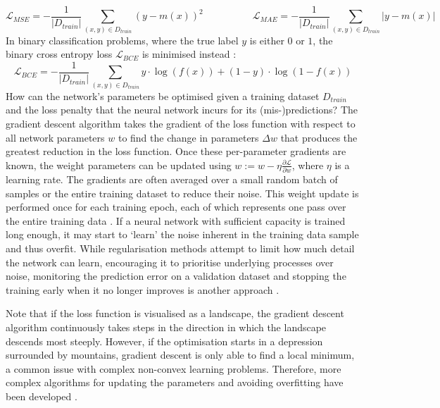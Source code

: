 \begin{equation*}
    \mathcal{L}_{MSE} = -\frac{1}{|D_{train}|} \sum_{(x, y) \in D_{train}}{(y - m(x))^2} \quad \quad \quad \quad \quad \mathcal{L}_{MAE} = -\frac{1}{|D_{train}|} \sum_{(x, y) \in D_{train}}{|y - m(x)|}
\end{equation*}
In binary classification problems, where the true label $y$ is either $0$ or $1$, the binary cross entropy loss $\mathcal{L}_{BCE}$ is minimised instead \cite{statistical-learning-2009}:
\begin{equation*}
    \mathcal{L}_{BCE} = -\frac{1}{|D_{train}|} \sum_{(x, y) \in D_{train}}{y \cdot \log(f(x)) + (1-y) \cdot \log(1-f(x))}
\end{equation*}
\noindent How can the network's parameters be optimised given a training dataset $D_{train}$ and the loss penalty that the neural network incurs for its (mis-)predictions? The gradient descent algorithm takes the gradient of the loss function with respect to all network parameters $w$ to find the change in parameters $\Delta w$ that produces the greatest reduction in the loss function. Once these per-parameter gradients are known, the weight parameters can be updated using $w := w - \eta \frac{\partial \mathcal{L}}{\partial w}$, where $\eta$ is a learning rate. The gradients are often averaged over a small random batch of samples or the entire training dataset to reduce their noise. This weight update is performed once for each training epoch, each of which represents one pass over the entire training data \cite{statistical-learning-2009}. If a neural network with sufficient capacity is trained long enough, it may start to `learn' the noise inherent in the training data sample and thus overfit. While regularisation methods attempt to limit how much detail the network can learn, encouraging it to prioritise underlying processes over noise, monitoring the prediction error on a validation dataset and stopping the training early when it no longer improves is another approach \cite{machine-learning-1997, statistical-learning-2009}.

Note that if the loss function is visualised as a landscape, the gradient descent algorithm continuously takes steps in the direction in which the landscape descends most steeply. However, if the optimisation starts in a depression surrounded by mountains, gradient descent is only able to find a local minimum, a common issue with complex non-convex learning problems. Therefore, more complex algorithms for updating the parameters and avoiding overfitting have been developed \cite{gradient-descent-overview-2017}.

